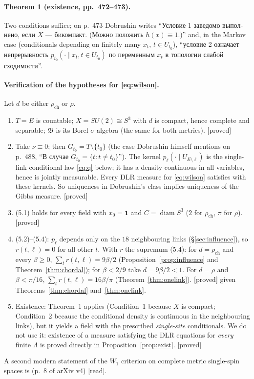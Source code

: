 \documentclass[11pt,a4paper]{article}
\theoremstyle{remark}
\theoremstyle{definition}
\theoremstyle{plain}
\theoremstyle{remark}
\newcommand{\st}[1]{\textsf{[#1]}}
\newcommand{\ru}[1]{\foreignlanguage{russian}{#1}}
\newcommand{\rch}{\rho_{\mathrm{ch}}}
\begin{document}
\paragraph{Theorem 1 (existence, pp.~472--473).} Two conditions suffice; on p.~473 Dobrushin writes
``\ru{Условие 1 заведомо выполнено, если $X$ --- бикомпакт. (Можно положить $h(x)\equiv1$.)}'' and, in the
Markov case (conditionals depending on finitely many $x_t$, $t\in U_{t_0}$), ``\ru{условие 2 означает
непрерывность $p_{t_0}(\cdot\mid x_t, t\in U_{t_0})$ по переменным $x_t$ в топологии слабой
сходимости}''.

\paragraph{Verification of the hypotheses for \eqref{eq:wilson}.} Let $d$ be either $\rch$ or $\rho$.
\begin{enumerate}
\item $T=E$ is countable; $X=SU(2)\cong S^3$ with $d$ is compact, hence complete and separable;
$\mathfrak B$ is its Borel $\sigma$-algebra (the same for both metrics). \st{proved}
\item Take $\nu\equiv0$; then $G_{t_0}=T\setminus\{t_0\}$ (the case Dobrushin himself mentions on
p.~488, ``\ru{В случае $G_{t_0}=\{t:t\neq t_0\}$}''). The kernel $p_{\ell}(\cdot\mid U_{E\setminus\ell})$ is
the single-link conditional law \eqref{eq:q} below; it has a density continuous in all variables, hence
is jointly measurable. Every DLR measure for \eqref{eq:wilson} satisfies \cite[(1.3)]{Dob70} with these
kernels. So uniqueness in Dobrushin's class implies uniqueness of the Gibbs measure. \st{proved}
\item (5.1) holds for every field with $x_0=\mathbf 1$ and $C=\operatorname{diam}S^3$ ($2$ for $\rch$, $\pi$ for $\rho$). \st{proved}
\item (5.2)--(5.4): $p_\ell$ depends only on the $18$ neighbouring links (\S\ref{sec:influence}), so
$r(t,\ell)=0$ for all other $t$. With $r$ the supremum (5.4): for $d=\rch$ and every $\beta\ge0$,
$\sum_t r(t,\ell)=9\beta/2$ (Proposition~\ref{prop:influence} and Theorem~\ref{thm:chordal}); for $\beta<2/9$ take $d=9\beta/2<1$.
For $d=\rho$ and $\beta<\pi/16$, $\sum_t r(t,\ell)=16\beta/\pi$ (Theorem~\ref{thm:onelink}). \st{proved} given
Theorems~\ref{thm:chordal} and~\ref{thm:onelink}.
\item Existence: Theorem~1 applies (Condition~1 because $X$ is compact; Condition~2 because the
conditional density is continuous in the neighbouring links), but it yields a field with the
prescribed \emph{single-site} conditionals. We do not use it: existence of a measure satisfying the DLR
equations for \emph{every} finite $\Lambda$ is proved directly in Proposition~\ref{prop:exist}. \st{proved}
\end{enumerate}
A second modern statement of the $W_1$ criterion on complete metric single-spin spaces is
\cite[Thm~3.5]{DS25} (p.~8 of arXiv v4) \st{read}.
\end{document}
